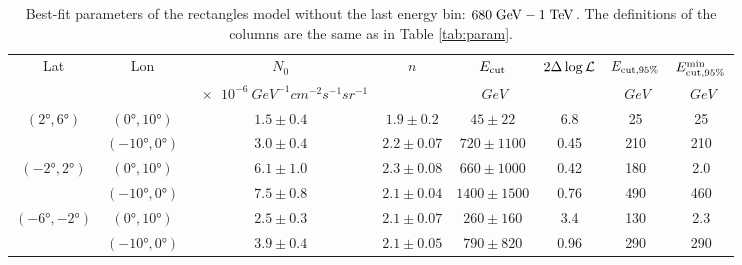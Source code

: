 \begin{table}
  \begin{center}
    \caption{Best-fit parameters of the rectangles model without the last energy bin: $680\;{\rm GeV} - 1\;{\rm TeV}$.
    The definitions of the columns are the same as in Table \ref{tab:param}.
    }
        \begin{tabular}{|c|c|c|c|c|c|c|c|} %
     	\hline
		 Lat & Lon  & $N_0$ & $n$ & $E_{\rm cut}$ &  $2 \Delta \log {\mathcal{L}}$ & $E_{\rm cut, 95\%}$ & $E_{\rm cut, 95\%}^{\rm min}$ \\ 
		     &        &  {\small $\SI{e-6}{GeV^{-1}cm^{-2}s^{-1} sr^{-1}}$ }&  & {\small $\SI{}{GeV}$ }& &{\small  $\SI{}{GeV}$ }&{\small  $\SI{}{GeV}$ }\\ 
		\hline
  		$(\ang{2}, \ang{6})$ & $(\ang{0}, \ang{10})$ & $1.5 \pm 0.4$ & $1.9 \pm 0.2$ & $45 \pm 22$ & 6.8 &25 & 25\\ 
		& $(\ang{-10}, \ang{0})$ & $3.0 \pm 0.4$ & $2.2 \pm 0.07$ & $720 \pm 1100$ & 0.45 & 210 & 210\\ 
 		\hline
  		$(\ang{-2}, \ang{2})$ & $(\ang{0}, \ang{10})$ & $6.1 \pm 1.0$ & $2.3 \pm 0.08$  & $660 \pm 1000$ & 0.42 & 180 & 2.0 \\ 
		& $(\ang{-10}, \ang{0})$ & $7.5 \pm 0.8$ & $2.1 \pm 0.04$ & $1400 \pm 1500$ & 0.76 & 490 & 460\\ 
 		\hline
  		$(\ang{-6}, \ang{-2})$ & $(\ang{0}, \ang{10})$ & $2.5 \pm 0.3$ & $2.1 \pm 0.07$ & $260 \pm 160$ & 3.4 & 130 & 2.3  \\ 
		& $(\ang{-10}, \ang{0})$ & $3.9 \pm 0.4$ & $2.1 \pm 0.05$ & $790 \pm 820$ & 0.96 & 290 & 290\\ 
 \hline
    \end{tabular}
  \end{center}
\end{table}
